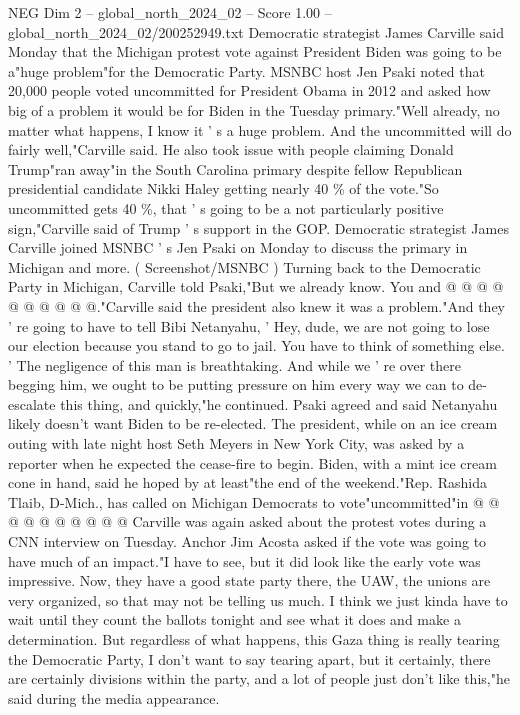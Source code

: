 \begin{textsample}{NEG Dim 2 – global\_north\_2024\_02 – Score 1.00 – global\_north\_2024\_02/200252949.txt}  \label{ex:f2_neg_180}
Democratic strategist James Carville said Monday that the Michigan protest vote against President Biden was going to be a"huge problem"for the Democratic Party.
MSNBC host Jen Psaki noted that 20,000 people voted uncommitted for President Obama in 2012 and asked how big of a problem it would be for Biden in the Tuesday primary."Well already, no matter what happens, I know it ' s a huge problem.
And the uncommitted will do fairly well,"Carville said.
He also took issue with people claiming Donald Trump"ran away"in the South Carolina primary despite fellow Republican presidential candidate Nikki Haley getting nearly 40 \% of the vote."So uncommitted gets 40 \%, that ' s going to be a not particularly positive sign,"Carville said of Trump ' s support in the GOP.
Democratic strategist James Carville joined MSNBC ' s Jen Psaki on Monday to discuss the primary in Michigan and more. ( Screenshot/MSNBC ) Turning back to the Democratic Party in Michigan, Carville told Psaki,"But we already know.
You and @ @ @ @ @ @ @ @ @ @."Carville said the president also knew it was a problem."And they ' re going to have to tell Bibi Netanyahu, ' Hey, dude, we are not going to lose our election because you stand to go to jail.
You have to think of something else. ' The negligence of this man is breathtaking.
And while we ' re over there begging him, we ought to be putting pressure on him every way we can to de-escalate this thing, and quickly,"he continued.
Psaki agreed and said Netanyahu likely doesn't want Biden to be re-elected.
The president, while on an ice cream outing with late night host Seth Meyers in New York City, was asked by a reporter when he expected the cease-fire to begin.
Biden, with a mint ice cream cone in hand, said he hoped by at least"the end of the weekend."Rep.
Rashida Tlaib, D-Mich., has called on Michigan Democrats to vote"uncommitted"in @ @ @ @ @ @ @ @ @ @ Carville was again asked about the protest votes during a CNN interview on Tuesday.
Anchor Jim Acosta asked if the vote was going to have much of an impact."I have to see, but it did look like the early vote was impressive.
Now, they have a good state party there, the UAW, the unions are very organized, so that may not be telling us much.
I think we just kinda have to wait until they count the ballots tonight and see what it does and make a determination.
But regardless of what happens, this Gaza thing is really tearing the Democratic Party, I don't want to say tearing apart, but it certainly, there are certainly divisions within the party, and a lot of people just don't like this,"he said during the media appearance.

\end{textsample}
